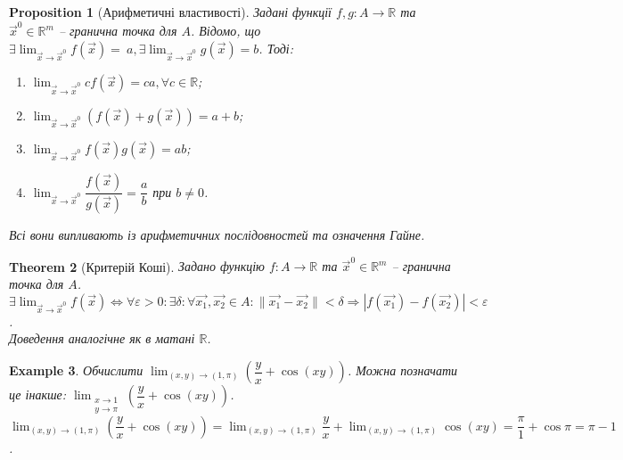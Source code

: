 \documentclass[a4paper, 10pt]{article}
\def\huge{\displaystyle}
\theoremstyle{theoremdd}
\newtheorem{theorem}{Theorem}[subsection]
\theoremstyle{theoremdd}
\theoremstyle{theoremdd}
\theoremstyle{theoremdd}
\theoremstyle{theoremdd}
\newtheorem{example}[theorem]{Example}
\theoremstyle{theoremdd}
\newtheorem{proposition}[theorem]{Proposition}
\theoremstyle{theoremdd}
\theoremstyle{theoremdd}
\theoremstyle{theoremdd}
\newcommand\Norm[1]{\|#1\|}
\begin{document}
\begin{proposition}[Арифметичні властивості]
Задані функції $f,g \colon A \to \mathbb{R}$ та $\vec{x}^0 \in \mathbb{R}^m$ -- гранична точка для $A$. Відомо, що $\exists \huge \lim_{\vec{x} \to \vec{x}^0} f(\vec{x}) = ~{a}, \exists \lim_{\vec{x} \to \vec{x}^0} g(\vec{x}) = b$. Тоді:
\begin{enumerate}[nosep,wide=0pt,label={\arabic*)}]
\item $\huge \lim_{\vec{x} \to \vec{x}^0} cf(\vec{x}) = ca, \forall c \in \mathbb{R}$;
\item $\huge \lim_{\vec{x} \to \vec{x}^0} (f(\vec{x}) + g(\vec{x})) = a + b$;
\item $\huge \lim_{\vec{x} \to \vec{x}^0} f(\vec{x})g(\vec{x}) = ab$;
\item $\huge \lim_{\vec{x} \to \vec{x}^0} \dfrac{f(\vec{x})}{g(\vec{x})} = \dfrac{a}{b}$ при $b \neq 0$.
\end{enumerate}
\textit{Всі вони випливають із арифметичних послідовностей та означення Гайне.}
\end{proposition}

\begin{theorem}[Критерій Коші]
Задано функцію $f \colon A \to \mathbb{R}$ та $\vec{x}^0 \in \mathbb{R}^m$ -- гранична точка для $A$.\\
$\exists \huge \lim_{\vec{x} \to \vec{x}^0} f(\vec{x}) \iff \forall \varepsilon > 0: \exists \delta: \forall \vec{x_1}, \vec{x_2} \in A: \Norm{\vec{x_1} - \vec{x_2}} < \delta \Rightarrow |f(\vec{x_1}) - f(\vec{x_2})| < \varepsilon$.\\
\textit{Доведення аналогічне як в матані $\mathbb{R}$.}
\end{theorem}

\begin{example}
Обчислити $\huge\lim_{(x,y) \to (1,\pi)} \left( \dfrac{y}{x} + \cos (xy) \right)$. Можна позначати це інакше: $\huge\lim_{\substack{x \to 1 \\ y \to \pi}} \left( \dfrac{y}{x} + \cos (xy) \right)$.\\
$\huge\lim_{(x,y) \to (1,\pi)} \left( \dfrac{y}{x} + \cos (xy) \right) = \lim_{(x,y) \to (1,\pi)} \dfrac{y}{x} + \lim_{(x,y) \to (1,\pi)} \cos (xy) = \dfrac{\pi}{1} + \cos \pi = \pi - 1$.
\end{example}
\end{document}
